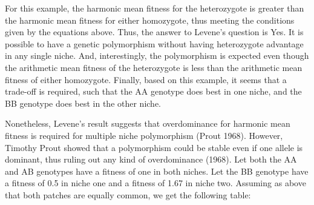 \documentclass[
  letterpaper,
]{book}
\begin{document}
For this example, the harmonic mean fitness for the heterozygote is
greater than the harmonic mean fitness for either homozygote, thus
meeting the conditions given by the equations above. Thus, the answer to
Levene's question is Yes. It is possible to have a genetic polymorphism
without having heterozygote advantage in any single niche. And,
interestingly, the polymorphism is expected even though the arithmetic
mean fitness of the heterozygote is less than the arithmetic mean
fitness of either homozygote. Finally, based on this example, it seems
that a trade-off is required, such that the AA genotype does best in one
niche, and the BB genotype does best in the other niche.

Nonetheless, Levene's result suggests that overdominance for harmonic
mean fitness is required for multiple niche polymorphism (Prout 1968).
However, Timothy Prout showed that a polymorphism could be stable even
if one allele is dominant, thus ruling out any kind of overdominance
(1968). Let both the AA and AB genotypes have a fitness of one in both
niches. Let the BB genotype have a fitness of 0.5 in niche one and a
fitness of 1.67 in niche two. Assuming as above that both patches are
equally common, we get the following table:
\end{document}
